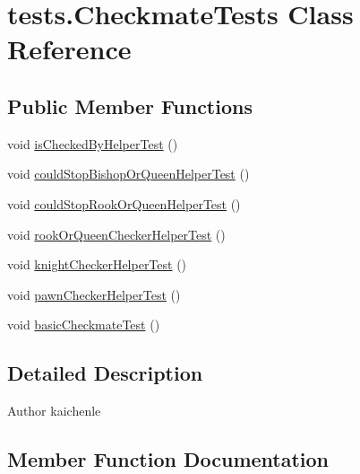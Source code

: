 \hypertarget{classtests_1_1_checkmate_tests}{}\section{tests.\+Checkmate\+Tests Class Reference}
\label{classtests_1_1_checkmate_tests}
\subsection*{Public Member Functions}
\begin{DoxyCompactItemize}
\item 
void \mbox{\hyperlink{classtests_1_1_checkmate_tests_aa26d7d35920877ced55ac2a9d3d3f5bb}{is\+Checked\+By\+Helper\+Test}} ()
\item 
void \mbox{\hyperlink{classtests_1_1_checkmate_tests_ad3b481956e7431abb9195d0298cc9bb9}{could\+Stop\+Bishop\+Or\+Queen\+Helper\+Test}} ()
\item 
void \mbox{\hyperlink{classtests_1_1_checkmate_tests_a946ebe534f0913494f112f75e847c851}{could\+Stop\+Rook\+Or\+Queen\+Helper\+Test}} ()
\item 
void \mbox{\hyperlink{classtests_1_1_checkmate_tests_a65507ac3ef2a1ab0240e8c9c597c1a5d}{rook\+Or\+Queen\+Checker\+Helper\+Test}} ()
\item 
void \mbox{\hyperlink{classtests_1_1_checkmate_tests_aa4d9c99b685fe1cc69d82e79d4baa6d5}{knight\+Checker\+Helper\+Test}} ()
\item 
void \mbox{\hyperlink{classtests_1_1_checkmate_tests_a8df8f93a3c7c01c1abe8db2d54431ab0}{pawn\+Checker\+Helper\+Test}} ()
\item 
void \mbox{\hyperlink{classtests_1_1_checkmate_tests_a7330f4d90ec276cdf82d6a0cc5219447}{basic\+Checkmate\+Test}} ()
\end{DoxyCompactItemize}


\subsection{Detailed Description}
\begin{DoxyAuthor}{Author}
kaichenle 
\end{DoxyAuthor}


\subsection{Member Function Documentation}
\mbox{\label{classtests_1_1_checkmate_tests_a7330f4d90ec276cdf82d6a0cc5219447}} 
